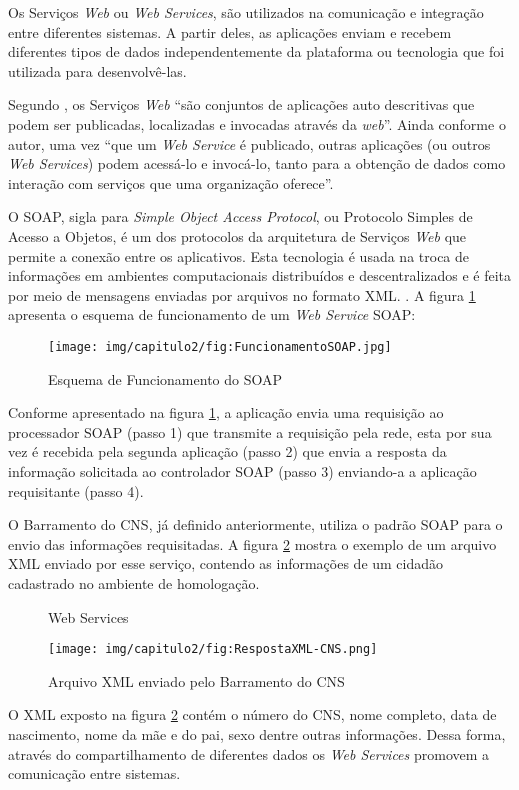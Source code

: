 Os Serviços \textit{Web} ou \textit{Web Services}, são utilizados na comunicação e integração entre diferentes sistemas. A partir deles, as aplicações enviam e recebem diferentes tipos de dados independentemente da plataforma ou tecnologia que foi utilizada para desenvolvê-las. 

Segundo , os Serviços \textit{Web} ``são conjuntos de aplicações auto descritivas que podem ser publicadas, localizadas e invocadas através da \textit{web}''. Ainda conforme o autor, uma vez ``que um \textit{Web Service} é publicado, outras aplicações (ou outros \textit{Web Services}) podem acessá-lo e invocá-lo, tanto para a obtenção de dados como interação com serviços que uma organização oferece''.

O SOAP, sigla para \textit{Simple Object Access Protocol}, ou Protocolo Simples de Acesso a Objetos, é um dos protocolos da arquitetura de Serviços \textit{Web} que permite a conexão entre os aplicativos. Esta tecnologia é usada na troca de informações em ambientes computacionais distribuídos e descentralizados e é feita por meio de mensagens enviadas por arquivos no formato XML. \cite{martins}. A figura \ref{fig:FuncionamentoSOAP} apresenta o esquema de funcionamento de um \textit{Web Service} SOAP:

\begin{figure}[H]
    \centering
     \caption{Esquema de Funcionamento do SOAP}
    \texttt{[image: img/capitulo2/fig:FuncionamentoSOAP.jpg]}
    \label{fig:FuncionamentoSOAP}
\end{figure}

Conforme apresentado na figura \ref{fig:FuncionamentoSOAP}, a aplicação envia uma requisição ao processador SOAP (passo 1) que transmite a requisição pela rede, esta por sua vez é recebida pela segunda aplicação (passo 2) que envia a resposta da informação solicitada ao controlador SOAP (passo 3) enviando-a a aplicação requisitante (passo 4).

O Barramento do CNS, já definido anteriormente, utiliza o padrão SOAP para o envio das informações requisitadas. A figura \ref{fig:RespostaXML-CNS} mostra o exemplo de um arquivo XML enviado por esse serviço, contendo as informações de um cidadão cadastrado no ambiente de homologação.

\begin{figure}[H]Web Services
    \centering
     \caption{Arquivo XML enviado pelo Barramento do CNS}
    \texttt{[image: img/capitulo2/fig:RespostaXML-CNS.png]}
    \label{fig:RespostaXML-CNS}
\end{figure}

O XML exposto na figura \ref{fig:RespostaXML-CNS} contém o número do CNS, nome completo, data de nascimento, nome da mãe e do pai, sexo dentre outras informações. Dessa forma, através do compartilhamento de diferentes dados os \textit{Web Services} promovem a comunicação entre sistemas. 










